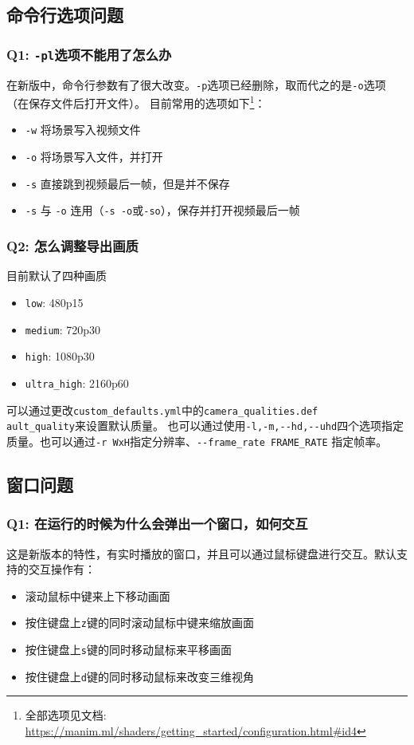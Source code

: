 \documentclass[cn,blue,14pt,normal]{elegantnote}
\begin{document}
\subsection{命令行选项问题}
\subsubsection*{Q1: \texttt{-pl}选项不能用了怎么办}
在新版中，命令行参数有了很大改变。\texttt{-p}选项已经删除，取而代之的是\texttt{-o}选项（在保存文件后打开文件）。
目前常用的选项如下\footnote{全部选项见文档: \url{https://manim.ml/shaders/getting\_started/configuration.html\#id4}}：
\begin{itemize}
	\item \texttt{-w} 将场景写入视频文件
	\item \texttt{-o} 将场景写入文件，并打开
	\item \texttt{-s} 直接跳到视频最后一帧，但是并不保存
	\item \texttt{-s} 与 \texttt{-o} 连用（\texttt{-s -o}或\texttt{-so}），保存并打开视频最后一帧
\end{itemize}

\subsubsection*{Q2: 怎么调整导出画质}
目前默认了四种画质
\begin{itemize}
	\item \texttt{low}: 480p15
	\item \texttt{medium}: 720p30
	\item \texttt{high}: 1080p30
	\item \texttt{ultra\_high}: 2160p60
\end{itemize}

可以通过更改\texttt{custom\_defaults.yml}中的\texttt{camera\_qualities.def}\\\texttt{ault\_quality}来设置默认质量。
也可以通过使用\texttt{-l,-m,-\!-hd,-\!-uhd}四个选项指定质量。也可以通过\texttt{-r WxH}指定分辨率、\texttt{-\!-frame\_rate FRAME\_RATE}
指定帧率。

\subsection{窗口问题}
\subsubsection*{Q1: 在运行的时候为什么会弹出一个窗口，如何交互}
这是新版本的特性，有实时播放的窗口，并且可以通过鼠标键盘进行交互。默认支持的交互操作有：
\begin{itemize}
	\item 滚动鼠标中键来上下移动画面
	\item 按住键盘上\texttt{z}键的同时滚动鼠标中键来缩放画面
	\item 按住键盘上\texttt{s}键的同时移动鼠标来平移画面
	\item 按住键盘上\texttt{d}键的同时移动鼠标来改变三维视角
\end{itemize}
\end{document}
